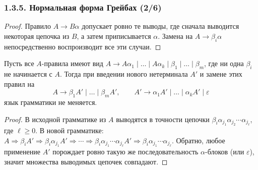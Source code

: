 \begin{frame}
\frametitle{1.3.5. Нормальная форма Грейбах (2/6)}


\begin{proof}
Правило $A\to B\alpha$ допускает ровно те выводы, где сначала выводится некоторая цепочка из $B$,
а затем приписывается $\alpha$.
Замена на $A\to \beta_i\alpha$ непосредственно воспроизводит все эти случаи. 
\end{proof}

\begin{lemma}
Пусть все $A$-правила имеют вид
$A\to A\alpha_1\mid \dots \mid A\alpha_k \mid \beta_1\mid \dots \mid \beta_m$,
где ни одна $\beta_i$ не начинается с $A$.
Тогда при введении нового нетерминала $A'$ и замене этих правил на
\[
A\to \beta_1A' \mid \dots \mid \beta_mA',\qquad
A'\to \alpha_1A' \mid \dots \mid \alpha_kA' \mid \varepsilon
\]
язык грамматики не меняется.
\end{lemma}

\begin{proof}
В исходной грамматике из $A$ выводятся в точности цепочки
$\beta_i\alpha_{j_1}\alpha_{j_2}\cdots \alpha_{j_\ell}$, где $\ell\ge 0$.
В новой грамматике:
$A\Rightarrow \beta_iA'\Rightarrow \beta_i\alpha_{j_1}A'\Rightarrow \cdots
\Rightarrow \beta_i\alpha_{j_1}\cdots \alpha_{j_\ell}A'\Rightarrow
\beta_i\alpha_{j_1}\cdots \alpha_{j_\ell}$.
Обратно, любое применение $A'$ порождает ровно такую же последовательность $\alpha$-блоков
(или $\varepsilon$), значит множества выводимых цепочек совпадают.
\end{proof}

\smallskip



\end{frame}


